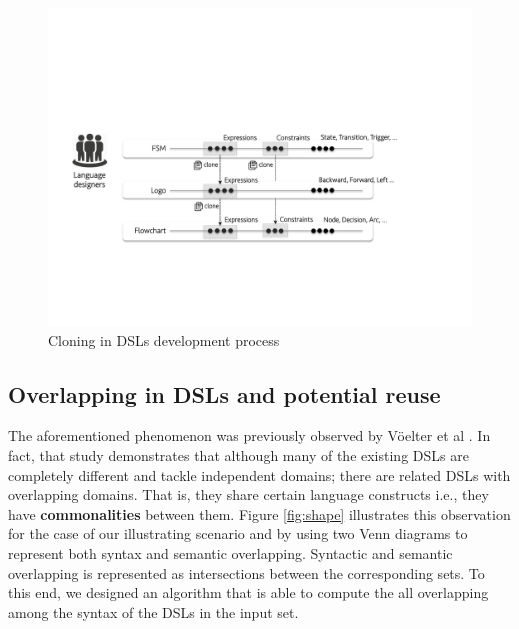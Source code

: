 \begin{figure}
\centering
\includegraphics[width=1\linewidth]{images/cloning.pdf}
\caption{Cloning in DSLs development process}
\label{fig:cloning}
\end{figure}




\subsection{Overlapping in DSLs and potential reuse}

The aforementioned phenomenon was previously observed by V\"oelter et al \cite[p. 60-61]{voelter:2013}. In fact, that study demonstrates that although many of the existing DSLs are completely different and tackle independent domains; there are related DSLs with overlapping domains. That is, they share certain language constructs i.e., they have \textbf{commonalities} between them. Figure \ref{fig:shape} illustrates this observation for the case of our illustrating scenario and by using two Venn diagrams to represent both syntax and semantic overlapping. Syntactic and semantic overlapping is represented as intersections between the corresponding sets. To this end, we designed an algorithm that is able to compute the all overlapping among the syntax of the DSLs in the input set. 


